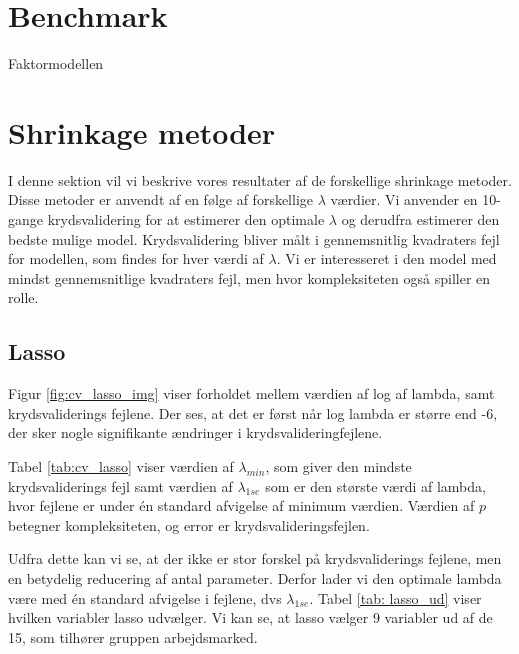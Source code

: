 \section{Benchmark}
Faktormodellen

\newpage

\section{Shrinkage metoder}
I denne sektion vil vi beskrive vores resultater af de forskellige shrinkage metoder. 
Disse metoder er anvendt af en følge af forskellige $\lambda$ værdier.
Vi anvender en 10-gange krydsvalidering for at estimerer den optimale $\lambda$ og derudfra estimerer den bedste mulige model. 
Krydsvalidering bliver målt i gennemsnitlig kvadraters fejl for modellen, som findes for hver værdi af $\lambda$. 
Vi er interesseret i den model med mindst gennemsnitlige kvadraters fejl, men hvor kompleksiteten også spiller en rolle.

\subsection{Lasso}
Figur \ref{fig:cv_lasso_img} viser forholdet mellem værdien af log af lambda, samt krydsvaliderings fejlene. 
Der ses, at det er først når log lambda er større end -6, der sker nogle signifikante ændringer i krydsvalideringfejlene.

 
Tabel \ref{tab:cv_lasso} viser værdien af $\lambda_{min}$, som giver den mindste krydsvaliderings fejl samt værdien af $\lambda_{1se}$ som er den største værdi af lambda, hvor fejlene er under én standard afvigelse  af minimum værdien.  Værdien af $p$ betegner kompleksiteten, og error er krydsvalideringsfejlen. 

Udfra dette kan vi se, at der ikke er stor forskel på krydsvaliderings fejlene, men en betydelig reducering af antal parameter. 
Derfor lader vi den optimale lambda være med én standard afvigelse i fejlene, dvs $\lambda_{1se}$. 
Tabel \ref{tab: lasso_ud} viser hvilken variabler lasso udvælger. Vi kan se, at lasso vælger 9 variabler ud af de 15, som tilhører gruppen arbejdsmarked. 



\newpage

